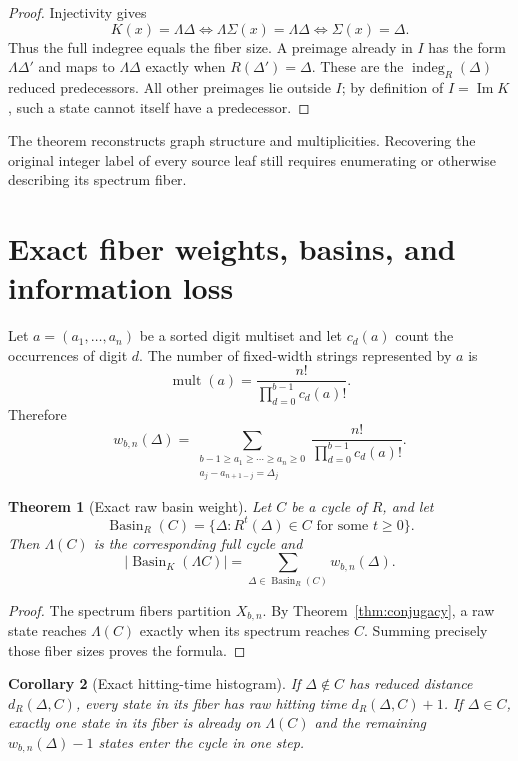 \documentclass[11pt]{article}
\newtheorem{theorem}{Theorem}[section]
\newtheorem{corollary}[theorem]{Corollary}
\theoremstyle{definition}
\theoremstyle{remark}
\newcommand{\1}{\mathbf{1}}
\newcommand{\Basin}{\operatorname{Basin}}
\newcommand{\indeg}{\operatorname{indeg}}
\DeclareMathOperator{\ImMap}{Im}
\begin{document}
\begin{proof}
Injectivity gives
\[
 K(x)=\Lambda\Delta
 \iff \Lambda\Sigma(x)=\Lambda\Delta
 \iff \Sigma(x)=\Delta.
\]
Thus the full indegree equals the fiber size.  A preimage already in $I$ has
the form $\Lambda\Delta'$ and maps to $\Lambda\Delta$ exactly when
$R(\Delta')=\Delta$.  These are the $\indeg_R(\Delta)$ reduced predecessors.
All other preimages lie outside $I$; by definition of $I=\ImMap K$, such a
state cannot itself have a predecessor.
\end{proof}

The theorem reconstructs graph structure and multiplicities.  Recovering the
original integer label of every source leaf still requires enumerating or
otherwise describing its spectrum fiber.

\section{Exact fiber weights, basins, and information loss}

Let $a=(a_1,\ldots,a_n)$ be a sorted digit multiset and let $c_d(a)$ count the
occurrences of digit $d$.  The number of fixed-width strings represented by
$a$ is
\[
  \operatorname{mult}(a)=\frac{n!}{\prod_{d=0}^{b-1}c_d(a)!}.
\]
Therefore
\begin{equation}\label{eq:fiber-weight}
 w_{b,n}(\Delta)
 =\sum_{\substack{b-1\geq a_1\geq\cdots\geq a_n\geq0\\
                   a_j-a_{n+1-j}=\Delta_j}}
   \frac{n!}{\prod_{d=0}^{b-1}c_d(a)!}.
\end{equation}

\begin{theorem}[Exact raw basin weight]\label{thm:basin}
Let $C$ be a cycle of $R$, and let
\[
  \Basin_R(C)=\{\Delta:R^t(\Delta)\in C\text{ for some }t\geq0\}.
\]
Then $\Lambda(C)$ is the corresponding full cycle and
\[
  |\Basin_K(\Lambda C)|
  =\sum_{\Delta\in\Basin_R(C)}w_{b,n}(\Delta).
\]
\end{theorem}

\begin{proof}
The spectrum fibers partition $X_{b,n}$.  By
Theorem~\ref{thm:conjugacy}, a raw state reaches $\Lambda(C)$ exactly when its
spectrum reaches $C$.  Summing precisely those fiber sizes proves the formula.
\end{proof}

\begin{corollary}[Exact hitting-time histogram]\label{cor:hitting}
If $\Delta\notin C$ has reduced distance $d_R(\Delta,C)$, every state in its
fiber has raw hitting time $d_R(\Delta,C)+1$.  If $\Delta\in C$, exactly one
state in its fiber is already on $\Lambda(C)$ and the remaining
$w_{b,n}(\Delta)-1$ states enter the cycle in one step.
\end{corollary}
\end{document}
